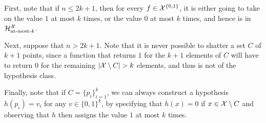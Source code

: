 \begin{ex}
\begin{enumerate}
          First, note that if $n\leq 2k+1$, then for every $f\in \mathcal{X}^{\{0, 1\}}$, it is
          either going to take on the value $1$ at most $k$ times, or the value $0$ at most
          $k$ times, and hence is in $\mathcal{H}^{\mathcal{X}}_{\text{at-most-$k$}}$.

          Next, suppose that $n>2k+1$. Note that it is never possible to shatter a set $C$ of
          $k+1$ points, since a function that returns $1$ for the $k+1$ elements of $C$ will have
          to return $0$ for the remaining $|\X\setminus C|>k$ elements, and thus is not of the
          hypothesis class.

          Finally, note that if $C=\{p_i\}_{i=1}^k$, we can always construct a hypothesis
          $h(p_i)=v_i$ for any $v\in \{0,1\}^k$, by specifying that $h(x)=0$ if $x\in \mathcal{X}\setminus C$
          and observing that $h$ then assigns the value $1$ at most $k$ times.
  \end{enumerate}
\end{ex}

\begin{ex}
\end{ex}

\begin{ex}
\end{ex}

\begin{ex}
\end{ex}

\begin{ex}
\end{ex}

\begin{ex}
\end{ex}

\begin{ex}
\end{ex}

\begin{ex}
\end{ex}

\begin{ex}
\end{ex}

\begin{ex}
\end{ex}

\begin{ex}
\end{ex}